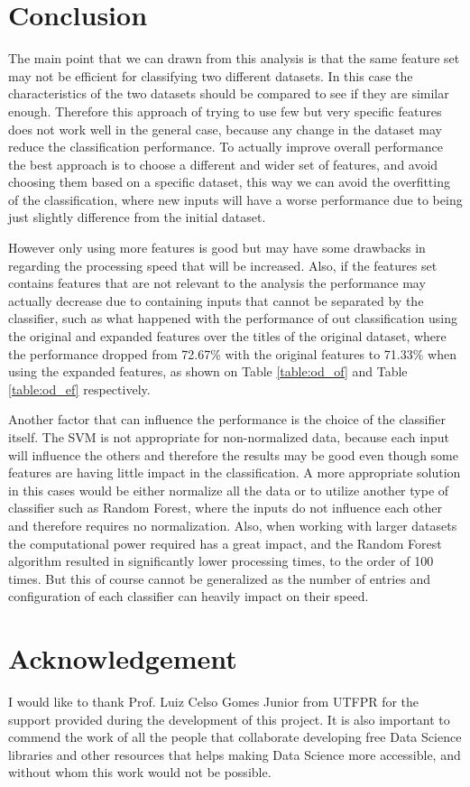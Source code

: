 \documentclass[conference]{IEEEtran}
\begin{document}
\section{Conclusion}

The main point that we can drawn from this analysis is that the same feature set may not be
efficient for classifying two different datasets. In this case the characteristics of the two
datasets should be compared to see if they are similar enough. Therefore this approach of
trying to use few but very specific features does not work well in the general case, because
any change in the dataset may reduce the classification performance. To actually improve overall
performance the best approach is to choose a different and wider set of features, and avoid choosing
them based on a specific dataset, this way we can avoid the overfitting of the classification,
where new inputs will have a worse performance due to being just slightly difference from the
initial dataset.

However only using more features is good but may have some drawbacks in regarding the processing
speed that will be increased. Also, if the features set contains features that are not relevant
to the analysis the performance may actually decrease due to containing inputs that cannot be
separated by the classifier, such as what happened with the performance of out classification using
the original and expanded features over the titles of the original dataset, where the performance
dropped from 72.67\% with the original features to 71.33\% when using the expanded features, as shown
on Table \ref{table:od_of} and Table \ref{table:od_ef} respectively.

Another factor that can influence the performance is the choice of the classifier itself.
The SVM is not appropriate for non-normalized data, because each input will influence the others
and therefore the results may be good even though some features are having little impact in the
classification. A more appropriate solution in this cases would be either normalize all the data
or to utilize another type of classifier such as Random Forest, where the inputs do not influence
each other and therefore requires no normalization. Also, when working with larger datasets the
computational power required has a great impact, and the Random Forest algorithm resulted in
significantly lower processing times, to the order of 100 times. But this of course cannot be
generalized as the number of entries and configuration of each classifier can heavily impact
on their speed.




\section*{Acknowledgement}

I would like to thank Prof. Luiz Celso Gomes Junior from UTFPR for the support
provided during the development of this project. It is also important to commend
the work of all the people that collaborate developing free Data Science libraries
and other resources that helps making Data Science more accessible, and without
whom this work would not be possible.



\end{document}
